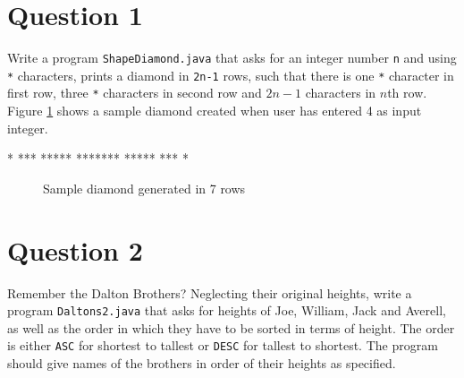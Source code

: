 %
%
%
%

\section*{Question 1}
Write a program \texttt{ShapeDiamond.java} that asks for an integer number \texttt{n} and using \texttt{*} characters, prints a diamond in \texttt{2n-1} rows, such that there is one \texttt{*} character in first row, three \texttt{*} characters in second row and $2n-1$ characters in $n$th row.
Figure \ref{fig1} shows a sample diamond created when user has entered 4 as input integer.
\begin{verbbox}
   *
  ***
 *****
*******
 *****
  ***
   *
\end{verbbox}
\begin{figure}[H]\centering
\theverbbox
\caption{Sample diamond generated in 7 rows} \label{fig1}
\end{figure}

\section*{Question 2}
Remember the Dalton Brothers? Neglecting their original heights, write a program \texttt{Daltons2.java} that asks for heights of Joe, William, Jack and Averell, as well as the order in which they have to be sorted in terms of height. The order is either \texttt{ASC} for shortest to tallest or \texttt{DESC} for tallest to shortest. The program should give names of the brothers in order of their heights as specified.
\newpage

